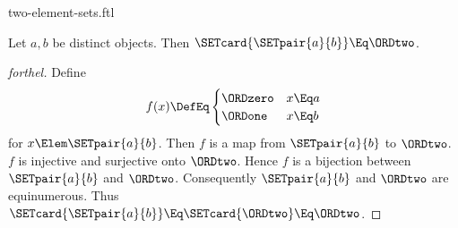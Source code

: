 \documentclass{stex}
\begin{document}
\begin{smodule}{two-element-sets.ftl}

\begin{proposition}[forthel]
  Let $a, b$ be distinct objects.
  Then $\SETcard{\SETpair{a}{b}} \Eq \ORDtwo$.
\end{proposition}
\begin{proof}[forthel]
  Define \[ f(x) \DefEq
    \begin{cases}
      \ORDzero  & x \Eq a
      \\
      \ORDone   & x \Eq b
    \end{cases} \]
  for $x \Elem \SETpair{a}{b}$.
  Then $f$ is a map from $\SETpair{a}{b}$ to $\ORDtwo$.
  $f$ is injective and surjective onto $\ORDtwo$.
  Hence $f$ is a bijection between $\SETpair{a}{b}$ and $\ORDtwo$.
  Consequently $\SETpair{a}{b}$ and $\ORDtwo$ are equinumerous.
  Thus $\SETcard{\SETpair{a}{b}} \Eq \SETcard{\ORDtwo} \Eq \ORDtwo$.
\end{proof}
\end{smodule}
\end{document}
